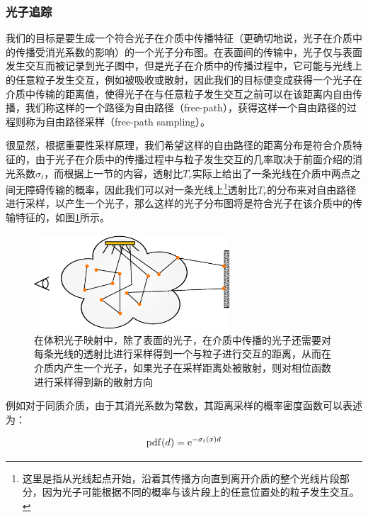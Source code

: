 \subsubsection{光子追踪}
我们的目标是要生成一个符合光子在介质中传播特征（更确切地说，光子在介质中的传播受消光系数的影响）的一个光子分布图。在表面间的传输中，光子仅与表面发生交互而被记录到光子图中，但是光子在介质中的传播过程中，它可能与光线上的任意粒子发生交互，例如被吸收或散射，因此我们的目标便变成获得一个光子在介质中传输的距离值，使得光子在与任意粒子发生交互之前可以在该距离内自由传播，我们称这样的一个路径为自由路径（free-path），获得这样一个自由路径的过程则称为自由路径采样（free-path sampling）。

很显然，根据重要性采样原理，我们希望这样的自由路径的距离分布是符合介质特征的，由于光子在介质中的传播过程中与粒子发生交互的几率取决于前面介绍的消光系数$\sigma_t$，而根据上一节的内容，透射比$T_r$实际上给出了一条光线在介质中两点之间无障碍传输的概率，因此我们可以对一条光线上\footnote{这里是指从光线起点开始，沿着其传播方向直到离开介质的整个光线片段部分，因为光子可能根据不同的概率与该片段上的任意位置处的粒子发生交互。}透射比$T_r$的分布来对自由路径进行采样，以产生一个光子，那么这样的光子分布图将是符合光子在该介质中的传输特征的，如图\ref{f:pm-volumetric-photon-tracing}所示。

\begin{figure}
	\sidecaption
	\includegraphics[width=0.65\textwidth]{figures/pm/volumetric-photon-tracing}
	\caption{在体积光子映射中，除了表面的光子，在介质中传播的光子还需要对每条光线的透射比进行采样得到一个与粒子进行交互的距离，从而在介质内产生一个光子，如果光子在采样距离处被散射，则对相位函数进行采样得到新的散射方向}
	\label{f:pm-volumetric-photon-tracing}
\end{figure}

例如对于同质介质，由于其消光系数为常数，其距离采样的概率密度函数可以表述为：

\begin{equation}
	{\rm pdf}(d)={\rm e}^{-\sigma_t(x)d}
\end{equation}

